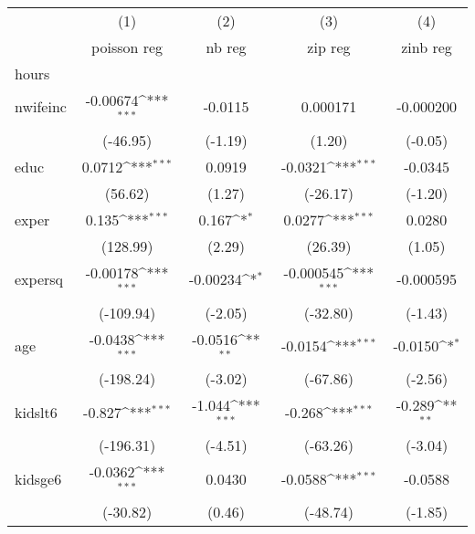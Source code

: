 {
\def\sym#1{\ifmmode^{#1}\else\(^{#1}\)\fi}
\begin{tabular}{l*{4}{c}}
\hline\hline
            &\multicolumn{1}{c}{(1)}&\multicolumn{1}{c}{(2)}&\multicolumn{1}{c}{(3)}&\multicolumn{1}{c}{(4)}\\
            &\multicolumn{1}{c}{poisson reg}&\multicolumn{1}{c}{nb reg}&\multicolumn{1}{c}{zip reg}&\multicolumn{1}{c}{zinb reg}\\
\hline
hours       &                     &                     &                     &                     \\
nwifeinc    &    -0.00674\sym{***}&     -0.0115         &    0.000171         &   -0.000200         \\
            &    (-46.95)         &     (-1.19)         &      (1.20)         &     (-0.05)         \\
[1em]
educ        &      0.0712\sym{***}&      0.0919         &     -0.0321\sym{***}&     -0.0345         \\
            &     (56.62)         &      (1.27)         &    (-26.17)         &     (-1.20)         \\
[1em]
exper       &       0.135\sym{***}&       0.167\sym{*}  &      0.0277\sym{***}&      0.0280         \\
            &    (128.99)         &      (2.29)         &     (26.39)         &      (1.05)         \\
[1em]
expersq     &    -0.00178\sym{***}&    -0.00234\sym{*}  &   -0.000545\sym{***}&   -0.000595         \\
            &   (-109.94)         &     (-2.05)         &    (-32.80)         &     (-1.43)         \\
[1em]
age         &     -0.0438\sym{***}&     -0.0516\sym{**} &     -0.0154\sym{***}&     -0.0150\sym{*}  \\
            &   (-198.24)         &     (-3.02)         &    (-67.86)         &     (-2.56)         \\
[1em]
kidslt6     &      -0.827\sym{***}&      -1.044\sym{***}&      -0.268\sym{***}&      -0.289\sym{**} \\
            &   (-196.31)         &     (-4.51)         &    (-63.26)         &     (-3.04)         \\
[1em]
kidsge6     &     -0.0362\sym{***}&      0.0430         &     -0.0588\sym{***}&     -0.0588         \\
            &    (-30.82)         &      (0.46)         &    (-48.74)         &     (-1.85)         \\

\end{tabular}}
